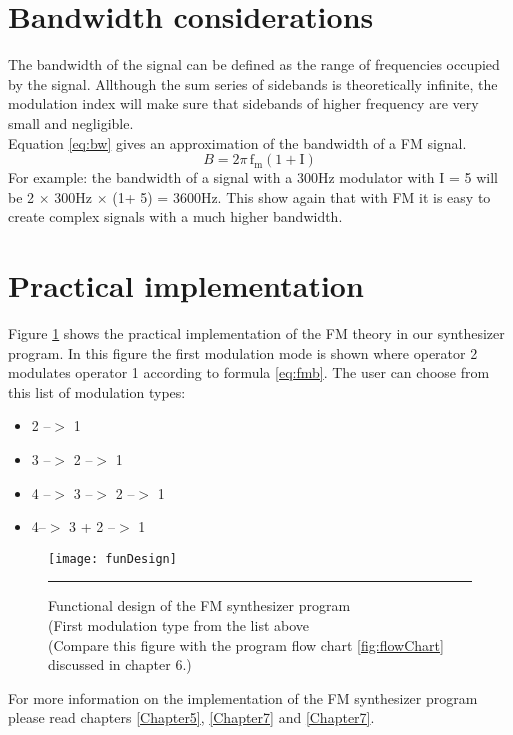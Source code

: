 \section{Bandwidth considerations}
The bandwidth of the signal can be defined as the range of frequencies occupied by the signal. Allthough the sum series of sidebands is theoretically infinite, the modulation index will make sure that sidebands of higher frequency are very small and negligible.\\Equation \ref{eq:bw} gives an approximation of the bandwidth of a FM signal. 
\begin{equation}
B = 2\pi\,\mathrm{f_{m}} (1 +\mathrm{I}) 
\label{eq:bw}
\end{equation}
For example: the bandwidth of a signal with a 300Hz modulator with I = 5 will be 2 $\times$ 300Hz $\times$ (1+ 5) = 3600Hz. This show again that with FM it is easy to create complex signals with a much higher bandwidth.
\section{Practical implementation}
Figure \ref{fig:funDesign} shows the practical implementation of the FM theory in our synthesizer program. In this figure the first modulation mode is shown where operator 2 modulates operator 1 according to formula \ref{eq:fmb}. The user can choose from this list of modulation types:
\begin{itemize}
\item 2 --$>$ 1
\item 3 --$>$ 2 --$>$ 1
\item 4 --$>$ 3 --$>$ 2 --$>$ 1
\item 4--$>$ 3 + 2 --$>$ 1
\end{itemize}
\begin{figure}[htbp]
\centering
\texttt{[image: funDesign]}
\rule{30em}{0.5pt}
\caption[Functional design of the FM synthesizer program]{Functional design of the FM synthesizer program \\ (First modulation type from the list above \\ (Compare this figure with the program flow chart \ref{fig:flowChart} discussed in chapter 6.)}
\label{fig:funDesign}
\end{figure}
For more information on the implementation of the FM synthesizer program please read chapters \ref{Chapter5}, \ref{Chapter7} and \ref{Chapter7}.\\ \\
